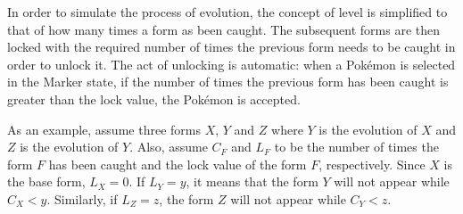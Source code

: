 \label{sec:evolution}

In order to simulate the process of evolution, the concept of level is simplified to that of how many times a form as been caught. The subsequent forms are then locked with the required number of times the previous form needs to be caught in order to unlock it. The act of unlocking is automatic: when a Pokémon is selected in the Marker state, if the number of times the previous form has been caught is greater than the lock value, the Pokémon is accepted.

As an example, assume three forms $X$, $Y$ and $Z$ where $Y$ is the evolution of $X$ and $Z$ is the evolution of $Y$. Also, assume $C_{F}$ and $L_{F}$ to be the number of times the form $F$ has been caught and the lock value of the form $F$, respectively. Since $X$ is the base form, $L_{X}=0$. If $L_{Y}=y$, it means that the form $Y$ will not appear while $C_{X}<y$. Similarly, if $L_{Z}=z$, the form $Z$ will not appear while $C_{Y}<z$.